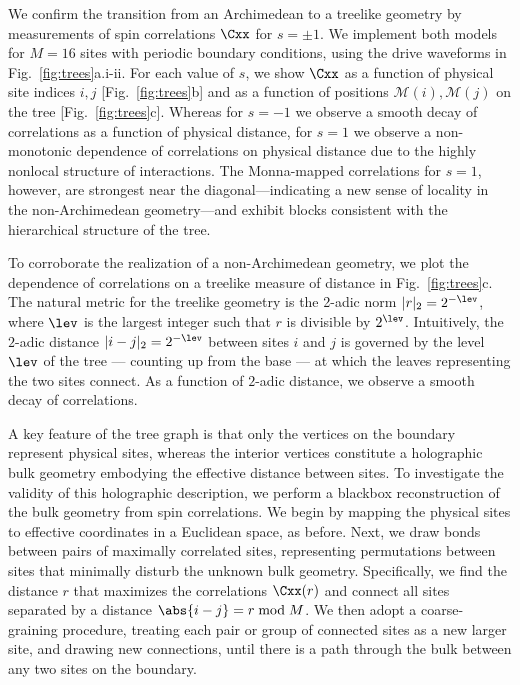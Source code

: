 \documentclass[aps,pra,superscriptaddress,12pt]{revtex4-1} %
\begin{document}
\begin{bibunit}
We confirm the transition from an Archimedean to a treelike geometry by
measurements of spin correlations $\Cxx$ for $s = \pm 1$.  We implement both models for $M=16$ sites with periodic boundary conditions, using the drive waveforms in Fig.~\ref{fig:trees}a.i-ii.  For each value of $s$, we show $\Cxx$ as a function of physical site indices $i,j$ [Fig.~\ref{fig:trees}b] and as a function of positions $\mathcal{M}(i), \mathcal{M}(j)$ on the tree [Fig.~\ref{fig:trees}c].  Whereas for $s = -1$ we observe a smooth decay of correlations as a function of physical distance, for $s = 1$ we observe a non-monotonic dependence of correlations on physical distance due to the highly nonlocal structure of interactions.  The Monna-mapped correlations for $s=1$, however, are strongest near the diagonal---indicating a new sense of locality in the non-Archimedean geometry---and exhibit blocks consistent with the hierarchical structure of the tree.

To corroborate the realization of a non-Archimedean geometry, we plot the dependence of correlations on a treelike measure of distance in Fig.~\ref{fig:trees}c.  The natural metric for the treelike geometry is the 2-adic norm $|r|_2 = 2^{-\lev}$, where $\lev$ is the largest integer such that $r$ is divisible by $2^\lev$.  Intuitively, the $2$-adic distance $|i-j|_2 = 2^{-\lev}$ between sites $i$ and $j$ is governed by the level $\lev$ of the tree --- counting up from the base --- at which the leaves representing the two sites connect.  As a function of $2$-adic distance, we observe a smooth decay of correlations.

A key feature of the tree graph is that only the vertices on the boundary represent physical sites, whereas the interior vertices constitute a holographic bulk geometry embodying the effective distance between sites.  To investigate the validity of this holographic description, we perform a blackbox reconstruction of the bulk geometry from spin correlations.  We begin by mapping the physical sites to effective coordinates in a Euclidean space, as before.  Next, we draw bonds between pairs of maximally correlated sites, representing permutations between sites that minimally disturb the unknown bulk geometry. Specifically, we find the distance $r$ that maximizes the correlations $\Cxx(r)$ and connect all sites separated by a distance $\abs{i-j}=r\bmod M$. We then adopt a coarse-graining procedure, treating each pair or group of connected sites as a new larger site, and drawing new connections, until there is a path through the bulk between any two sites on the boundary.  


\end{bibunit}
\end{document}
